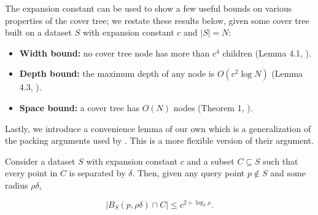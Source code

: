 The expansion constant can be used to show a few useful bounds on various
properties of the cover tree; we restate these results below, given some cover
tree built on a dataset $S$ with expansion constant $c$ and $|S| = N$:

\begin{itemize}
  \item {\bf Width bound:} no cover tree node has more than $c^4$ children
(Lemma 4.1, \cite{langford2006}).

  \item {\bf Depth bound:} the maximum depth of any node is $O(c^2 \log N)$
(Lemma 4.3, \cite{langford2006}).

  \item {\bf Space bound:} a cover tree has $O(N)$ nodes (Theorem 1,
\cite{langford2006}).
\end{itemize}



Lastly, we introduce a convenience lemma of our own which is a generalization of
the packing arguments used by \citet{langford2006}.  This is a more flexible
version of their argument.

\begin{lemma}
Consider a dataset $S$ with expansion constant $c$ and a subset $C \subseteq S$
such that every point in $C$ is separated by $\delta$.  Then, given any query
point $p \not\in S$ and some radius $\rho \delta$,

\begin{equation}
| B_S(p, \rho \delta) \cap C | \le c^{2 + \log_2 \rho}.
\end{equation}
\label{lem:packing}
\end{lemma}

